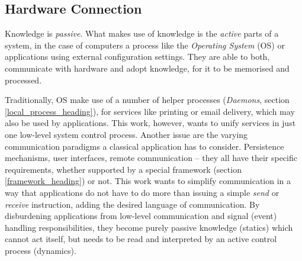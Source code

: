 %
%
%
%
%
%
%

\subsection{Hardware Connection}
\label{hardware_connection_heading}

Knowledge is \emph{passive}. What makes use of knowledge is the \emph{active}
parts of a system, in the case of computers a process like the
\emph{Operating System} (OS) or applications using external configuration
settings. They are able to both, communicate with hardware and adopt knowledge,
for it to be memorised and processed.

Traditionally, OS make use of a number of helper processes (\emph{Daemons},
section \ref{local_process_heading}), for services like printing or email
delivery, which may also be used by applications. This work, however, wants to
unify services in just one low-level system control process. Another issue are
the varying communication paradigms a classical application has to consider.
Persistence mechanisms, user interfaces, remote communication -- they all have
their specific requirements, whether supported by a special framework (section
\ref{framework_heading}) or not. This work wants to simplify communication in a
way that applications do not have to do more than issuing a simple \emph{send}
or \emph{receive} instruction, adding the desired language of communication. By
disburdening applications from low-level communication and signal (event)
handling responsibilities, they become purely passive knowledge (statics) which
cannot act itself, but needs to be read and interpreted by an active control
process (dynamics).

